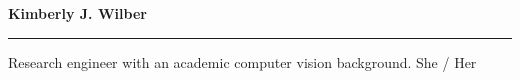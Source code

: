 \documentclass[10pt,letterpaper]{article}
\begin{document}
\thispagestyle{plain}
\begin{minipage}{0.70\textwidth}
  \flushleft
{\bfseries\Huge Kimberly J. Wilber}
\vspace{-0.8em}
\rule[0.7em]{\linewidth}{0.5mm}
Research engineer with an academic computer vision background.
\hfill {She / Her}
\end{minipage}
\hfill
\begin{minipage}[ht]{0.28\textwidth}
\end{minipage}
\end{document}
